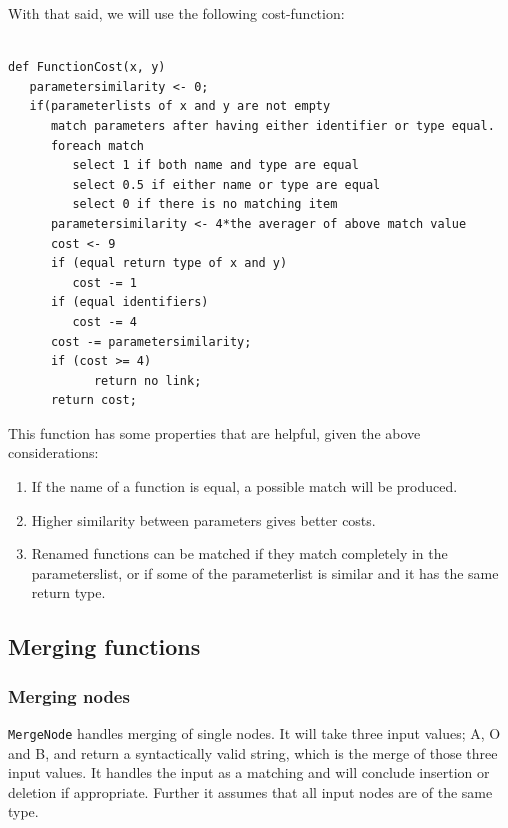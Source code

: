 \documentclass[11pt]{article}
\begin{document}
With that said, we will use the following cost-function:
\begin{verbatim}

def FunctionCost(x, y)
   parametersimilarity <- 0;
   if(parameterlists of x and y are not empty
      match parameters after having either identifier or type equal.
      foreach match
         select 1 if both name and type are equal
         select 0.5 if either name or type are equal
         select 0 if there is no matching item
      parametersimilarity <- 4*the averager of above match value
      cost <- 9
      if (equal return type of x and y)
         cost -= 1
      if (equal identifiers)
         cost -= 4
      cost -= parametersimilarity;
      if (cost >= 4)
            return no link;
      return cost;
\end{verbatim}

This function has some properties that are helpful, given the above considerations:

\begin{enumerate}
\item If the name of a function is equal, a possible match will be produced.
\item Higher similarity between parameters gives better costs.
\item Renamed functions can be matched if they match completely in the parameterslist, or if some of the parameterlist is similar and it has the same return type.
\end{enumerate}


\subsection{Merging functions}

\subsubsection{Merging nodes}
\texttt{MergeNode} handles merging of single nodes. It will take three input values; A, O and B, and return a syntactically valid string, which is the merge of those three input values. It handles the input as a matching and will conclude insertion or deletion if appropriate. Further it assumes that all input nodes are of the same type.
\end{document}
